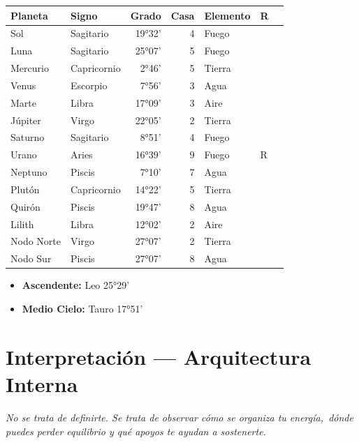 \documentclass[11pt,a4paper]{article}
\begin{document}
\begin{center}
\begin{tabular}{llrrlll}
  \toprule
  \textbf{Planeta} & \textbf{Signo} & \textbf{Grado} & \textbf{Casa} &
  \textbf{Elemento} & \textbf{R} \\
  \midrule
  Sol & Sagitario & 19°32' & 4 & Fuego &  \\
  Luna & Sagitario & 25°07' & 5 & Fuego &  \\
  Mercurio & Capricornio & 2°46' & 5 & Tierra &  \\
  Venus & Escorpio & 7°56' & 3 & Agua &  \\
  Marte & Libra & 17°09' & 3 & Aire &  \\
  Júpiter & Virgo & 22°05' & 2 & Tierra &  \\
  Saturno & Sagitario & 8°51' & 4 & Fuego &  \\
  Urano & Aries & 16°39' & 9 & Fuego & R \\
  Neptuno & Piscis & 7°10' & 7 & Agua &  \\
  Plutón & Capricornio & 14°22' & 5 & Tierra &  \\
  Quirón & Piscis & 19°47' & 8 & Agua &  \\
  Lilith & Libra & 12°02' & 2 & Aire &  \\
  Nodo Norte & Virgo & 27°07' & 2 & Tierra &  \\
  Nodo Sur & Piscis & 27°07' & 8 & Agua &  \\
  \bottomrule
\end{tabular}
\end{center}

\vspace{0.5cm}
\begin{itemize}
  \item \textbf{Ascendente:} Leo 25°29'
  \item \textbf{Medio Cielo:} Tauro 17°51'
\end{itemize}

\newpage

\section{Interpretación — Arquitectura Interna}

\begin{center}
{\small\itshape
No se trata de definirte. Se trata de observar cómo se organiza tu energía,\
dónde puedes perder equilibrio y qué apoyos te ayudan a sostenerte.
}
\end{center}
\end{document}
